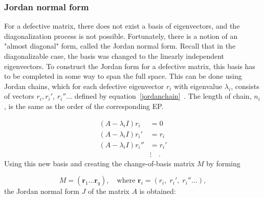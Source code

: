 \documentclass[../main.tex]{subfiles}
\begin{document}
\subsubsection{Jordan normal form}

For a defective matrix, there does not exist a basis of eigenvectors, and the diagonalization process is not possible. Fortunately, there is a notion of an "almost diagonal" form, called the Jordan normal form. Recall that in the diagonalizable case, the basis was changed to the linearly independent eigenvectors. To construct the Jordan form for a defective matrix, this basis has to be completed in some way to span the full space. This can be done using Jordan chains, which for each defective eigenvector $r_i$ with eigenvalue $\lambda_i$, consists of vectors $r_i, r_i'$, $r_i'' \dots$ defined by equation~\eqref{jordanchain}~\cite{uffe}. The length of chain, $n_i$, is the same as the order of the corresponding EP.

\begin{equation}\label{jordanchain}
\begin{aligned}
    (A-\lambda_iI)r_i &= 0 \\
    (A-\lambda_iI)r_i' &= r_i \\
    (A-\lambda_iI)r_i'' &= r_i' \\
    &\vdots \quad.
\end{aligned}
\end{equation}
Using this new basis and creating the change-of-basis matrix $M$ by forming

\begin{equation}\label{chofba}
    M = (\boldsymbol{r}_1 \dots \boldsymbol{r}_q), \quad \text{where } \boldsymbol{r}_i = (r_i,\; r_i',\; r_i'' \dots), 
\end{equation}
the Jordan normal form $J$ of the matrix $A$ is obtained:
\end{document}
